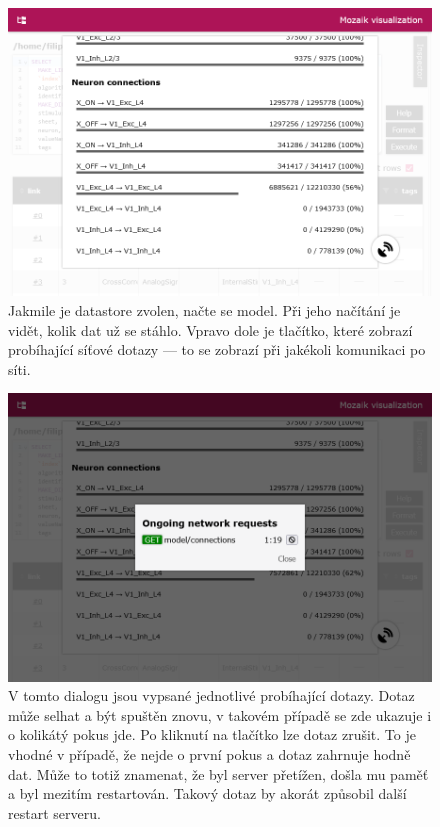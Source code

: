 \begin{figure}
	\centering
	\includegraphics[width=1\linewidth]{img/screenshot_loading_model.png}
	\caption{Jakmile je datastore zvolen, načte se model. Při jeho načítání je vidět, kolik dat už se stáhlo. Vpravo dole je tlačítko, které zobrazí probíhající síťové dotazy --- to se zobrazí při jakékoli komunikaci po síti.}
	\label{fig:loading-model}
\end{figure}

\begin{figure}
	\centering
	\includegraphics[width=1\linewidth]{img/screenshot_network.png}
	\caption{V tomto dialogu jsou vypsané jednotlivé probíhající dotazy. Dotaz může selhat a být spuštěn znovu, v takovém případě se zde ukazuje i o kolikátý pokus jde. Po kliknutí na tlačítko lze dotaz zrušit. To je vhodné v případě, že nejde o první pokus a dotaz zahrnuje hodně dat. Může to totiž znamenat, že byl server přetížen, došla mu paměť a byl mezitím restartován. Takový dotaz by akorát způsobil další restart serveru.}
	\label{fig:network}
\end{figure}

